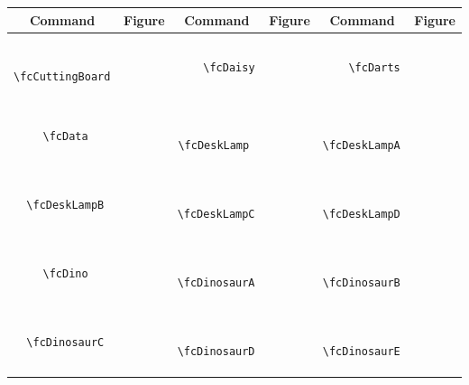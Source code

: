 \documentclass[x11names]{article}
\begin{document}
\begin{table}[H]\centering\begin{tabular}{|c|c|c|c|c|c|}\hline{\bf Command} & {\bf Figure} & {\bf Command} & {\bf Figure} & {\bf Command} & {\bf Figure}\\	\hline	&\multirow{5}{*}{	\fcCuttingBoard	[scale=0.16]} & &\multirow{5}{*}{	\fcDaisy	[scale=0.16]} & &\multirow{5}{*}{	\fcDarts	[scale=0.16]}\\	& & & & & \\	& & & & & \\	\verb|	\fcCuttingBoard	| & & \verb|	\fcDaisy	| & & \verb|	\fcDarts	| & \\	& & & & & \\	& & & & & \\	& & & & & \\	\hline									
		&\multirow{5}{*}{	\fcData	[scale=0.16]} & &\multirow{5}{*}{	\fcDeskLamp	[scale=0.16]} & &\multirow{5}{*}{	\fcDeskLampA	[scale=0.16]}\\	& & & & & \\	& & & & & \\	\verb|	\fcData	| & & \verb|	\fcDeskLamp	| & & \verb|	\fcDeskLampA	| & \\	& & & & & \\	& & & & & \\	& & & & & \\	\hline									
		&\multirow{5}{*}{	\fcDeskLampB	[scale=0.16]} & &\multirow{5}{*}{	\fcDeskLampC	[scale=0.16]} & &\multirow{5}{*}{	\fcDeskLampD	[scale=0.16]}\\	& & & & & \\	& & & & & \\	\verb|	\fcDeskLampB	| & & \verb|	\fcDeskLampC	| & & \verb|	\fcDeskLampD	| & \\	& & & & & \\	& & & & & \\	& & & & & \\	\hline									
		&\multirow{5}{*}{	\fcDino	[scale=0.64]} & &\multirow{5}{*}{	\fcDinosaurA	[scale=0.09]} & &\multirow{5}{*}{	\fcDinosaurB	[scale=0.09]}\\	& & & & & \\	& & & & & \\	\verb|	\fcDino	| & & \verb|	\fcDinosaurA	| & & \verb|	\fcDinosaurB	| & \\	& & & & & \\	& & & & & \\	& & & & & \\	\hline									
		&\multirow{5}{*}{	\fcDinosaurC	[scale=0.09]} & &\multirow{5}{*}{	\fcDinosaurD	[scale=0.09]} & &\multirow{5}{*}{	\fcDinosaurE	[scale=0.09]}\\	& & & & & \\	& & & & & \\	\verb|	\fcDinosaurC	| & & \verb|	\fcDinosaurD	| & & \verb|	\fcDinosaurE	| & \\	& & & & & \\	& & & & & \\	& & & & & \\	\hline									

\end{tabular}
\end{table}
\end{document}

